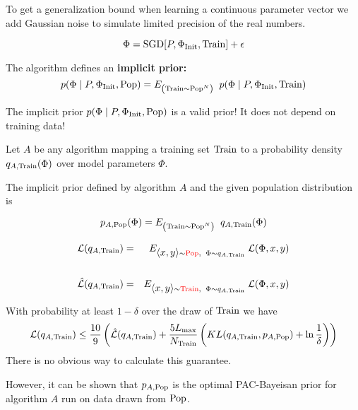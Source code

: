 {To get a generalization bound when learning a continuous parameter vector we add Gaussian noise to simulate limited precision of the real numbers.

$$\Phi = \mathrm{SGD}\!\left[P,\Phi_{\mathrm{Init}},\mathrm{Train}\right] + \epsilon$$

\vfill
The algorithm defines an {\bf implicit prior:}
$$p\!\left(\Phi\;|\;P,\Phi_{\mathrm{Init}},\mathrm{Pop}\right) = E_{\left(\mathrm{Train} \sim \mathrm{Pop}^N\right)}\;\;p\!\left(\Phi\;|\;P,\Phi_{\mathrm{Init}},\mathrm{Train}\right)$$

\vfill
The implicit prior $p\!\left(\Phi\;|\;P,\Phi_{\mathrm{Init}},\mathrm{Pop}\right)$ is a valid prior!  It does not depend on training data!


Let $A$ be any algorithm mapping a training set $\mathrm{Train}$ to a probability density $q_{A,\mathrm{Train}}(\Phi)$ over model parameters $\Phi$.

\vfill
The implicit prior defined by algorithm $A$ and the given population distribution is

$$p_{A,\mathrm{Pop}}(\Phi) = E_{\left(\mathrm{Train} \sim \mathrm{Pop}^{N}\right)} \;\;q_{A,\mathrm{Train}}(\Phi)$$


\begin{eqnarray*}
{\cal L}(q_{A,\mathrm{Train}}) & = & E_{{\mbox{$\langle x,y\rangle$}} \sim {\color{red}  \mathrm{Pop}}, \;\;\Phi \sim q_{A,\mathrm{Train}}}\;{\cal L}(\Phi,x,y) \\
\\
\hat{\cal L}(q_{A,\mathrm{Train}}) & = & E_{{\mbox{$\langle x,y\rangle$}} \sim {\color{red} \mathrm{Train}}, \;\;\Phi \sim q_{A,\mathrm{Train}}}\;{\cal L}(\Phi,x,y)
\end{eqnarray*}


With probability at least $1-\delta$ over the draw of $\mathrm{Train}$ we have
\vfill
{\huge
$${\cal L}(q_{A,\mathrm{Train}}) \leq \frac{10}{9}\left( \hat{\cal L}(q_{A,\mathrm{Train}}) + \frac{5L_{\max}}{N_\mathrm{Train}}\left(KL(q_{A,\mathrm{Train}},p_{A,\mathrm{Pop}})+ \ln\frac{1}{\delta}\right)\right)$$
}
\vfill
There is no obvious way to calculate this guarantee.

\vfill
However, it can be shown that $p_{A,\mathrm{Pop}}$ is the optimal PAC-Bayeisan prior for algorithm $A$ run on data drawn from $\mathrm{Pop}$.


}

